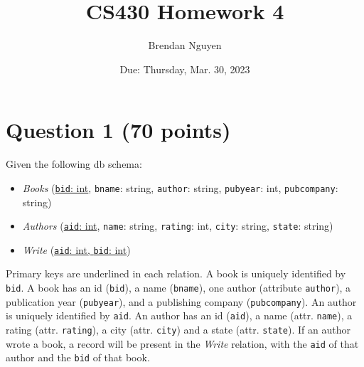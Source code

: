 \documentclass[letterpaper, 11pt]{article}
\title{CS430 Homework 4}
\author{Brendan Nguyen}
\date{Due: Thursday, Mar. 30, 2023}
\begin{document}
\maketitle

\section*{Question 1 (70 points)}

Given the following db schema:
\begin{itemize}
    \item \textit{Books} (\ul{\texttt{bid}: int}, \texttt{bname}: string, \texttt{author}: string, \texttt{pubyear}: int, \texttt{pubcompany}: string)
    \item \textit{Authors} (\ul{\texttt{aid}: int}, \texttt{name}: string, \texttt{rating}: int, \texttt{city}: string, \texttt{state}: string)
    \item \textit{Write} (\ul{\texttt{aid}: int, \texttt{bid}: int})
\end{itemize}

Primary keys are underlined in each relation. A book is uniquely identified by \texttt{bid}. A book has an id (\texttt{bid}), a name (\texttt{bname}), one author (attribute \texttt{author}), a publication year (\texttt{pubyear}), and a publishing company (\texttt{pubcompany}). An author is uniquely identified by \texttt{aid}. An author has an id (\texttt{aid}), a name (attr. \texttt{name}), a rating (attr. \texttt{rating}), a city (attr. \texttt{city}) and a state (attr. \texttt{state}). If an author wrote a book, a record will be present in the \textit{Write} relation, with the \texttt{aid} of that author and the \texttt{bid} of that book. 
\end{document}
